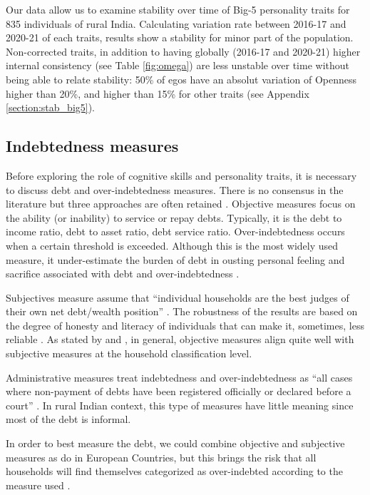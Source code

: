 \documentclass[a4paper, 11pt, onecolumn]{article}
\begin{document}
Our data allow us to examine stability over time of Big-5 personality traits for 835 individuals of rural India.
Calculating variation rate between 2016-17 and 2020-21 of each traits, results show a stability for minor part of the population.
Non-corrected traits, in addition to having globally (2016-17 and 2020-21) higher internal consistency (see Table \ref{fig:omega}) are less unstable over time without being able to relate stability: 50\% of egos have an absolut variation of Openness higher than 20\%, and higher than 15\% for other traits (see Appendix \ref{section:stab_big5}).




	\subsection{Indebtedness measures}

Before exploring the role of cognitive skills and personality traits, it is necessary to discuss debt and over-indebtedness measures.
There is no consensus in the literature but three approaches are often retained \citep{Betti2007, Ferreira2000}.
Objective measures focus on the ability (or inability) to service or repay debts.
Typically, it is the debt to income ratio, debt to asset ratio, debt service ratio.
Over-indebtedness occurs when a certain threshold is exceeded.
Although this is the most widely used measure, it under-estimate the burden of debt in ousting personal feeling and sacrifice associated with debt and over-indebtedness \citep{Betti2007}.
 
Subjectives measure assume that ``individual households are the best judges of their own net debt/wealth position'' \citep{Betti2007}.
The robustness of the results are based on the degree of honesty and literacy of individuals that can make it, sometimes, less reliable \citep{Betti2007, DAlessio2013}.
As stated by \cite{Rinaldi2006} and \cite{Keese2012}, in general, objective measures align quite well with subjective measures at the household classification level.

Administrative measures treat indebtedness and over-indebtedness as ``all cases
where non-payment of debts have been registered officially or declared before a court'' \citep{Betti2007}.
In rural Indian context, this type of measures have little meaning since most of the debt is informal.

In order to best measure the debt, we could combine objective and subjective measures as \cite{Aniola2012} do in European Countries, but this brings the risk that all households will find themselves categorized as over-indebted according to the measure used \citep{Chichaibelu2018}.
\end{document}
